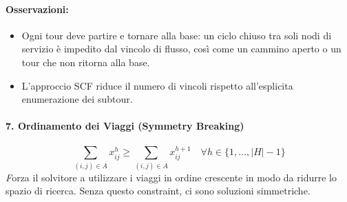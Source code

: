 \documentclass{article}
\begin{document}
\paragraph{Osservazioni:}

\begin{itemize}
    \item Ogni tour deve partire e tornare alla base: un ciclo chiuso tra soli nodi di servizio è impedito dal vincolo di flusso, così come un cammino aperto o un tour che non ritorna alla base.
    \item L'approccio SCF riduce il numero di vincoli rispetto all'esplicita enumerazione dei subtour.
\end{itemize}


\paragraph{7. Ordinamento dei Viaggi (Symmetry Breaking)}
\begin{equation}
    \sum_{(i,j) \in A} x_{ij}^{h} \ge \sum_{(i,j) \in A} x_{ij}^{h+1} \quad \forall h \in \{1, \dots, |H|-1\}
\end{equation}
\textit   Forza il solvitore a utilizzare i viaggi in ordine crescente in modo da ridurre lo spazio di ricerca. Senza questo constraint, ci sono soluzioni simmetriche.
\end{document}

